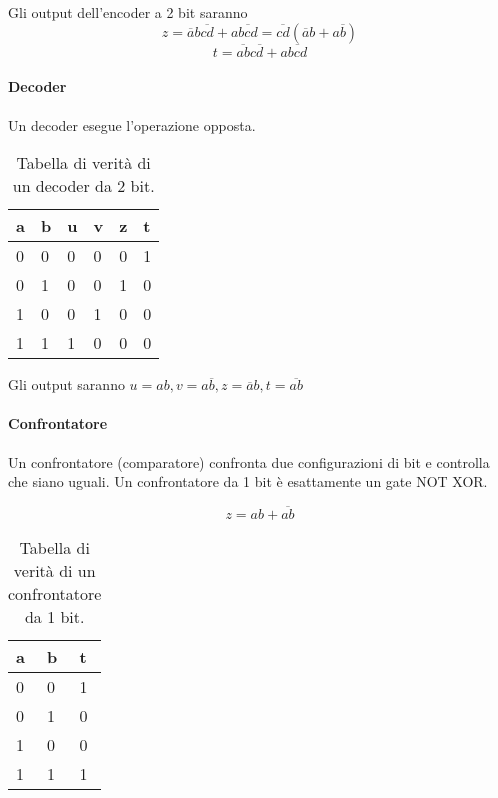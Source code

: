 
Gli output dell'encoder a 2 bit saranno
\[ z = \overbar{a}b\overbar{cd}+a\overbar{bcd} = \overbar{cd}(\overbar{a}b+a\overbar{b}) \]
\[ t = \overbar{ab}c\overbar{d}+a\overbar{bcd} \]


\paragraph{Decoder}
Un decoder esegue l'operazione opposta.

\begin{table}[H]
	\centering
	\caption{Tabella di verità di un decoder da 2 bit.}
	\label{tab:2bitdecoder}
	\begin{tabular}{|ll|llll|}
		\hline
		a & b & u & v & z & t \\ \hline
		0 & 0 & 0 & 0 & 0 & 1 \\
		0 & 1 & 0 & 0 & 1 & 0 \\
		1 & 0 & 0 & 1 & 0 & 0 \\
		1 & 1 & 1 & 0 & 0 & 0 \\ \hline
	\end{tabular}
\end{table}

Gli output saranno $ u = ab, v = a\overbar{b}, z = \overbar{a}b, t = \overbar{ab} $



\paragraph{Confrontatore}
Un confrontatore (comparatore) confronta due configurazioni di bit e controlla che siano uguali. Un confrontatore da 1 bit è esattamente un gate NOT XOR.

\[ z = ab + \overbar{ab} \]

\begin{table}[H]
	\centering
	\caption{Tabella di verità di un confrontatore da 1 bit.}
	\label{tab:2bitcomparator}
	\begin{tabular}{|ll|l|}
		\hline
		a & b & t \\ \hline
		0 & 0 & 1 \\
		0 & 1 & 0 \\
		1 & 0 & 0 \\
		1 & 1 & 1 \\ \hline
	\end{tabular}
\end{table}

